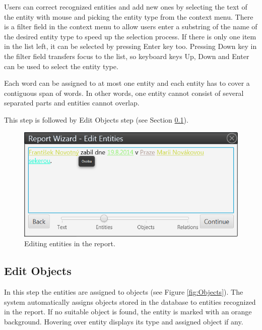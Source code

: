 Users can correct recognized entities and add new ones by selecting the text
of the entity with mouse and picking the entity type from the context menu.
There is a filter field in the context menu to allow users enter a substring of
the name of the desired entity type to speed up the selection process. If there is
only one item in the list left, it can be selected by pressing Enter key too.
Pressing Down key in the filter field transfers focus to the list, so keyboard
keys Up, Down and Enter can be used to select the entity type.

Each word can be assigned to at most one entity and each entity has to cover a
contiguous span of words. In other words, one entity cannot consist of several separated parts and entities cannot
overlap.

This step is followed by Edit Objects step (see Section
\ref{sssec:EditObjects}).

\begin{figure}[!htb]
        \centering
        \includegraphics[width=\textwidth]{Images/entities}
        \caption{Editing entities in the report.}
        \label{fig:Entities}
\end{figure}

\subsection{Edit Objects}
\label{sssec:EditObjects}

In this step the entities are assigned to \textan{} objects (see Figure
\ref{fig:Objects}). The system automatically assigns objects stored in the
database to entities recognized in the report. If no suitable object is
found, the entity is marked with an orange background. Hovering over entity
displays its type and assigned object if any.

